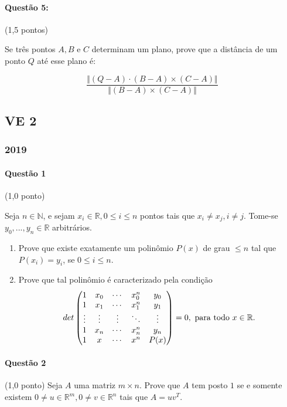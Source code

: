 \documentclass[12pt,a4paper]{article}
\newcommand{\R}{\mathbb{R}}
\begin{document}
\paragraph{Questão 5:} (1,5 pontos)

Se três pontos $A, B$ e $C$ determinam um plano, prove que a distância de um ponto $Q$
até esse plano é:

$$\dfrac{\Vert (Q-A)\cdot (B-A)\times (C-A) \Vert}{\Vert (B-A)\times (C-A) \Vert} $$

\newpage
\subsection{VE 2}

\subsubsection{2019}

\paragraph{Questão 1} (1,0 ponto)

Seja $n \in \mathbb{N}$, e sejam $x_i \in \R, 0 \leq i \leq n$ pontos tais que $x_i \neq x_j, i \neq j$. Tome-se $y_0, ..., y_n \in \R$ arbitrários.

\begin{enumerate}[label=\alph*)]
    \item Prove que existe exatamente um polinômio $P(x)$ de grau $ \leq n$ tal que $P(x_i) = y_i$, se $0 \leq i \leq n.$

    \item Prove que tal polinômio é caracterizado pela condição
    $$det \begin{pmatrix}
    1       & x_0    & \cdots  & x^{n}_0 & y_0\\
    1       & x_1    & \cdots  & x^{n}_1 & y_1\\
    \vdots  & \vdots & \vdots  & \ddots  & \vdots\\
    1       & x_n    & \cdots  & x^{n}_n & y_n\\
    1       & x      & \cdots  & x^{n}   & P(x)

    \end{pmatrix} = 0, \textnormal{ para todo } x \in \R.$$

\end{enumerate}  

\paragraph{Questão 2} (1,0 ponto)
Seja $A$ uma matriz $m \times n$. Prove que $A$ tem posto $1$ se e somente existem $0 \neq u \in \R^m, 0 \neq v \in \R^n$ tais que $A = uv^{T}.$
\end{document}
